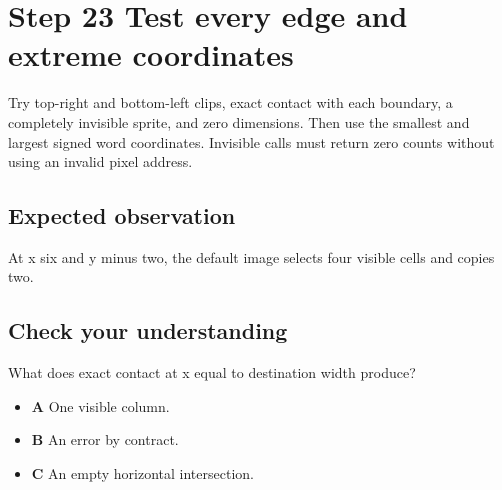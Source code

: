 \section{Step 23 Test every edge and extreme coordinates}\label{blit-s23}

Try top-right and bottom-left clips, exact contact with each boundary, a completely invisible sprite, and zero dimensions. Then use the smallest and largest signed word coordinates. Invisible calls must return zero counts without using an invalid pixel address.


\subsection{Expected observation}
At x six and y minus two, the default image selects four visible cells and copies two.

\subsection{Check your understanding}
What does exact contact at x equal to destination width produce?

\begin{itemize}
  \item \textbf{A} One visible column.
  \item \textbf{B} An error by contract.
  \item \textbf{C} An empty horizontal intersection.
\end{itemize}

